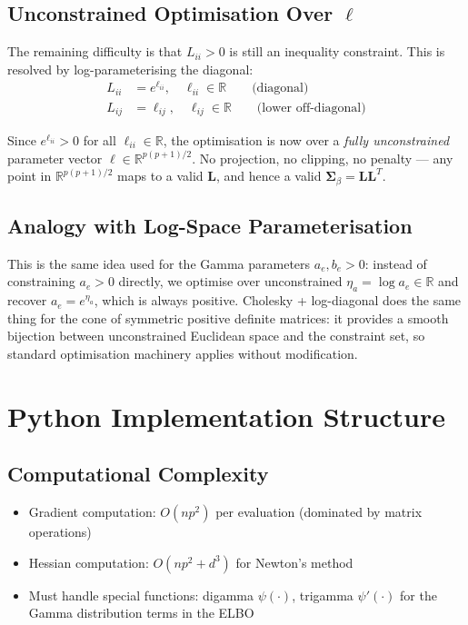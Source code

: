 \documentclass[11pt,a4paper]{article}
\newcommand{\R}{\mathbb{R}}
\begin{document}
\subsection*{Unconstrained Optimisation Over $\bm{\ell}$}

The remaining difficulty is that $L_{ii} > 0$ is still an inequality constraint. This is resolved by log-parameterising the diagonal:
\begin{align}
  L_{ii} &= e^{\ell_{ii}}, \quad \ell_{ii} \in \R \qquad \text{(diagonal)}\\
  L_{ij} &= \ell_{ij}, \quad \ell_{ij} \in \R \qquad \text{(lower off-diagonal)}
\end{align}

Since $e^{\ell_{ii}} > 0$ for all $\ell_{ii} \in \R$, the optimisation is now over a \emph{fully unconstrained} parameter vector $\bm{\ell} \in \R^{p(p+1)/2}$. No projection, no clipping, no penalty --- any point in $\R^{p(p+1)/2}$ maps to a valid $\bm{L}$, and hence a valid $\bm{\Sigma}_\beta = \bm{L}\bm{L}^T$.

\subsection*{Analogy with Log-Space Parameterisation}

This is the same idea used for the Gamma parameters $a_e, b_e > 0$: instead of constraining $a_e > 0$ directly, we optimise over unconstrained $\eta_a = \log a_e \in \R$ and recover $a_e = e^{\eta_a}$, which is always positive. Cholesky + log-diagonal does the same thing for the cone of symmetric positive definite matrices: it provides a smooth bijection between unconstrained Euclidean space and the constraint set, so standard optimisation machinery applies without modification.

\bigskip


\section{Python Implementation Structure}
\label{app:python-code}

\subsection*{Computational Complexity}

\begin{itemize}
\item Gradient computation: $O(np^2)$ per evaluation (dominated by matrix operations)
\item Hessian computation: $O(np^2 + d^3)$ for Newton's method
\item Must handle special functions: digamma $\psi(\cdot)$, trigamma $\psi'(\cdot)$ for the Gamma distribution terms in the ELBO
\end{itemize}
\end{document}
